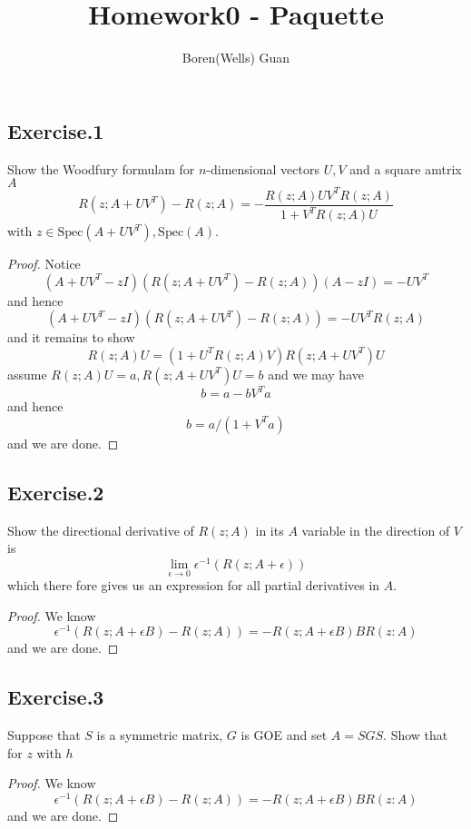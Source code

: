 \documentclass[lang=en,11pt,a4paper,citestyle =authoryear]{elegantpaper}
\title{Homework0 - Paquette}
\author{Boren(Wells) Guan}
\begin{document}
\maketitle

\subsection*{Exercise.1}Show the Woodfury formulam for $n$-dimensional vectors $U,V$ and a square amtrix $A$
\[R(z;A+UV^T) - R(z;A) = - \dfrac{R(z;A)UV^TR(z;A)}{1+V^TR(z;A)U}\]
with $z\in \text{Spec}(A+UV^T),\text{Spec}(A)$.
\begin{proof}
    Notice
    \[
    (A+UV^T-zI)(R(z;A+UV^T) - R(z;A))(A-zI) = -UV^T
    \]
    and hence
    \[
    (A+UV^T-zI)(R(z;A+UV^T) - R(z;A)) = -UV^TR(z;A)
    \]
    and it remains to show
    \[
    R(z;A)U = (1+U^TR(z;A)V)R(z;A+UV^T)U
    \]
    assume $R(z;A)U = a, R(z;A+UV^T)U = b$ and we may have
    \[
    b = a - bV^Ta
    \]
    and hence
    \[
    b = a/(1+V^Ta)
    \]
    and we are done.
\end{proof}

\subsection*{Exercise.2}Show the directional derivative of $R(z;A)$ in its $A$ variable in the direction of $V$ is
\[
\lim_{\epsilon \to 0}\epsilon^{-1}(R(z;A+\epsilon))
\]
which there fore gives us an expression for all partial derivatives in $A$.
\begin{proof}
    We know
    \[
    \epsilon^{-1}(R(z;A+\epsilon B) - R(z;A)) = -R(z;A+\epsilon B)BR(z:A)
    \]
    and we are done.
\end{proof}

\subsection*{Exercise.3}Suppose that $S$ is a symmetric matrix, $G$ is GOE and set $A = SGS$. Show that for $z$ with $h$
\begin{proof}
    We know
    \[
    \epsilon^{-1}(R(z;A+\epsilon B) - R(z;A)) = -R(z;A+\epsilon B)BR(z:A)
    \]
    and we are done.
\end{proof}

\addappheadtotoc
\end{document}
